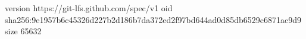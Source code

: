 version https://git-lfs.github.com/spec/v1
oid sha256:9e1957b6c45326d227b2d186b7da372ed2f97bd644ad0d85db6529c6871ac9d9
size 65632
